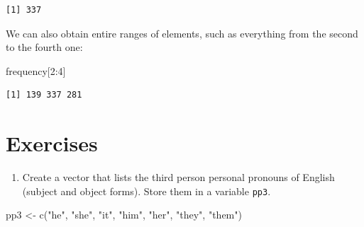 \documentclass[
  11pt,
  letterpaper,
  DIV=11,
  numbers=noendperiod]{scrreprt}
\newenvironment{Shaded}{\begin{snugshade}}{\end{snugshade}}
\newcommand{\DecValTok}[1]{\textcolor[rgb]{0.68,0.00,0.00}{#1}}
\newcommand{\FunctionTok}[1]{\textcolor[rgb]{0.28,0.35,0.67}{#1}}
\newcommand{\NormalTok}[1]{\textcolor[rgb]{0.00,0.23,0.31}{#1}}
\newcommand{\OtherTok}[1]{\textcolor[rgb]{0.00,0.23,0.31}{#1}}
\newcommand{\SpecialCharTok}[1]{\textcolor[rgb]{0.37,0.37,0.37}{#1}}
\newcommand{\StringTok}[1]{\textcolor[rgb]{0.13,0.47,0.30}{#1}}
\providecommand{\tightlist}{%
  \setlength{\itemsep}{0pt}\setlength{\parskip}{0pt}}\usepackage{longtable,booktabs,array}
\begin{document}
\begin{verbatim}
[1] 337
\end{verbatim}

We can also obtain entire ranges of elements, such as everything from
the second to the fourth one:

\begin{Shaded}
\begin{Highlighting}[]
\NormalTok{frequency[}\DecValTok{2}\SpecialCharTok{:}\DecValTok{4}\NormalTok{]}
\end{Highlighting}
\end{Shaded}

\begin{verbatim}
[1] 139 337 281
\end{verbatim}

\section{Exercises}\label{exercises}

\begin{enumerate}
\def\labelenumi{\arabic{enumi}.}
\tightlist
\item
  Create a vector that lists the third person personal pronouns of
  English (subject and object forms). Store them in a variable
  \texttt{pp3}.
\end{enumerate}

\begin{Shaded}
\begin{Highlighting}[]
\NormalTok{pp3 }\OtherTok{\textless{}{-}} \FunctionTok{c}\NormalTok{(}\StringTok{"he"}\NormalTok{, }\StringTok{"she"}\NormalTok{, }\StringTok{"it"}\NormalTok{, }\StringTok{"him"}\NormalTok{, }\StringTok{"her"}\NormalTok{, }\StringTok{"they"}\NormalTok{, }\StringTok{"them"}\NormalTok{)}
\end{Highlighting}
\end{Shaded}
\end{document}
